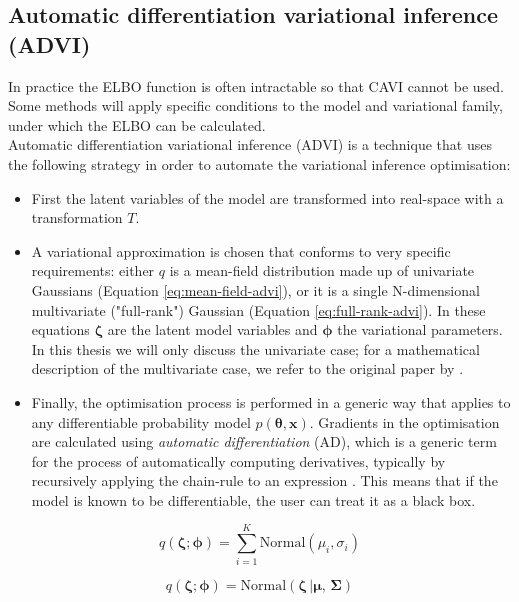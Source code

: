 \subsection{Automatic differentiation variational inference (ADVI)} \label{sec:advi}

In practice the ELBO function is often intractable so that CAVI cannot be used. Some methods will apply specific conditions to the model and variational family, under which the ELBO can be calculated.
\\
Automatic differentiation variational inference (ADVI) is a technique that uses the following strategy in order to automate the variational inference optimisation:

\begin{itemize}
    \item First the latent variables of the model are transformed into real-space with a transformation $T$.
    
    \item A variational approximation is chosen that conforms to very specific requirements: either $q$ is a mean-field distribution made up of univariate Gaussians (Equation \ref{eq:mean-field-advi}), or it is a single N-dimensional multivariate ("full-rank") Gaussian (Equation \ref{eq:full-rank-advi}). In these equations $\bm \zeta$ are the latent model variables and $\bm \phi $ the variational parameters. In this thesis we will only discuss the univariate case; for a mathematical description of the multivariate case, we refer to the original paper by \cite{ADVI}.
    
    \item Finally, the optimisation process is performed in a generic way that applies to any differentiable probability model $p(\bm{\theta}, \bm{x})$. Gradients in the optimisation are calculated using \textit{automatic differentiation} (AD), which is a generic term for the process of automatically computing derivatives, typically by recursively applying the chain-rule to an expression \parencite{AD}. This means that if the model is known to be differentiable, the user can treat it as a black box. 
\end{itemize}


\begin{equation} 
    \label{eq:mean-field-advi}
    q(\bm{\zeta}; \bm{\phi}) = \sum^K_{i=1} \mathrm{Normal}(\mu_i, \sigma_i)
\end{equation}

\begin{equation}
    \label{eq:full-rank-advi}
    q(\bm{\zeta}; \bm{\phi}) = \mathrm{Normal(\bm{\zeta} \, | \bm{\mu}, \, \bm{\Sigma})}
\end{equation}


